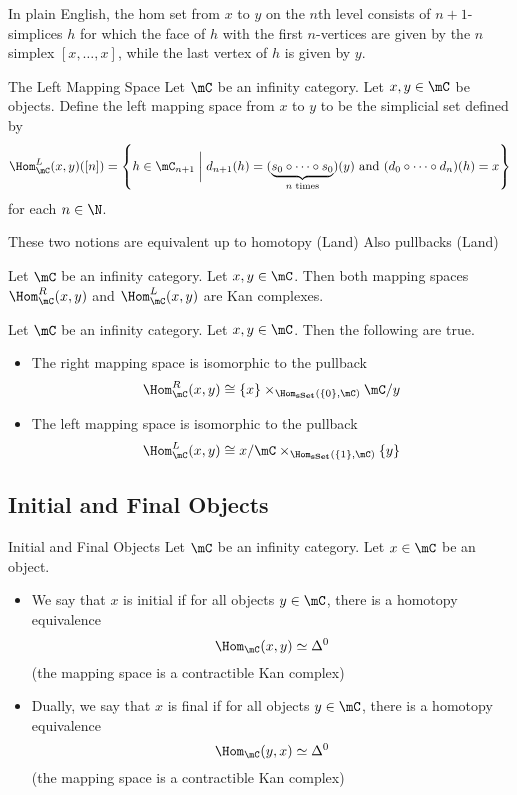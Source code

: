\documentclass[a4paper]{article}
\begin{document}
In plain English, the hom set from $x$ to $y$ on the $n$th level consists of $n+1$-simplices $h$ for which the face of $h$ with the first $n$-vertices are given by the $n$ simplex $[x,\dots,x]$, while the last vertex of $h$ is given by $y$. 

\begin{defn}{The Left Mapping Space}{} Let $\mC$ be an infinity category. Let $x,y\in\mC$ be objects. Define the left mapping space from $x$ to $y$ to be the simplicial set defined by $$\Hom_\mC^L(x,y)([n])=\left\{h\in\mC_{n+1}\;\bigg{|}\;d_{n+1}(h)=(\underbrace{s_0\circ\cdots\circ s_0}_{n\text{ times}})(y)\text{ and }(d_0\circ\cdots\circ d_n)(h)=x\right\}$$ for each $n\in\N$. 
\end{defn}

These two notions are equivalent up to homotopy (Land) Also pullbacks (Land)

\begin{prp}{}{} Let $\mC$ be an infinity category. Let $x,y\in\mC$. Then both mapping spaces $\Hom_\mC^R(x,y)$ and $\Hom_\mC^L(x,y)$ are Kan complexes. 
\end{prp}

\begin{prp}{}{} Let $\mC$ be an infinity category. Let $x,y\in\mC$. Then the following are true. 
\begin{itemize}
\item The right mapping space is isomorphic to the pullback $$\Hom_\mC^R(x,y)\cong\{x\}\times_{\Hom_\bold{sSet}(\{0\},\mC)}\mC/y$$
\item The left mapping space is isomorphic to the pullback $$\Hom_\mC^L(x,y)\cong x/\mC\times_{\Hom_\bold{sSet}(\{1\},\mC)}\{y\}$$
\end{itemize}
\end{prp}

\subsection{Initial and Final Objects}
\begin{defn}{Initial and Final Objects}{} Let $\mC$ be an infinity category. Let $x\in\mC$ be an object. 
\begin{itemize}
\item We say that $x$ is initial if for all objects $y\in\mC$, there is a homotopy equivalence $$\Hom_\mC(x,y)\simeq\Delta^0$$ (the mapping space is a contractible Kan complex)
\item Dually, we say that $x$ is final if for all objects $y\in\mC$, there is a homotopy equivalence $$\Hom_\mC(y,x)\simeq\Delta^0$$ (the mapping space is a contractible Kan complex)
\end{itemize}
\end{defn}
\end{document}
